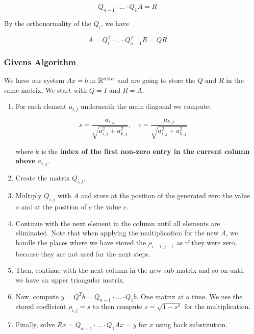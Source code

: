 \[
    Q_{n-1}\cdot \dots \cdot Q_1 A = R
\]

By the orthonormality of the \(Q_i\), we have 

\[
    A = Q_1^T \cdot \dots \cdot Q_{n-1}^T R = Q R
\]

\subsubsection{Givens Algorithm}

We have our system \(Ax = b\) in \(\mathbb{R}^{n \times n}\) and are going to store the \(Q\) and \(R\) in the same matrix. 
We start with \(Q = I\) and \(R = A\).

\begin{enumerate}

    \item For each element \(a_{i, j}\) underneath the main diagonal we compute: 

    \[
        s = \frac{a_{i,j}}{\sqrt{a_{i,j}^2 + a_{k,j}^2}}, \quad c = \frac{a_{k, j}}{\sqrt{a_{i,j}^2 + a_{k,j}^2}}
    \]

    where \(k\) is the \textbf{index of the first non-zero entry in the current column above} \(a_{i, j}\).

    \item Create the matrix \(Q_{i,j}\).

    \item Multiply \(Q_{i,j}\) with \(A\) and store at the position of the generated zero the value \(s\) and at the position of \(c\) the value \(c\).

    \item Continue with the next element in the column until all elements are eliminated. 
    Note that when applying the multiplication for the new \(A\), we handle the places where we have stored the \(\rho_{i - 1, j - 1}\) as if they were zero, 
    because they are not used for the next steps.
    
    \item Then, continue with the next column in the new sub-matrix and so on until we have an upper triangular matrix.

    \item Now, compute \(y = Q^T b = Q_{n-1} \cdot \dots \cdot Q_1 b\). One matrix at a time. We use the stored coefficient \(\rho_{i,j} = s\) to then compute 
    \(s = \sqrt{1 - s^2}\) for the multiplication.

    \item Finally, solve \(Rx = Q_{n-1} \cdot \dots \cdot Q_1 Ax= y\) for \(x\) using back substitution.

\end{enumerate}

